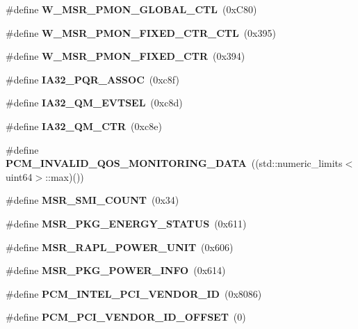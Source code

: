 \begin{DoxyCompactItemize}
\mbox{\label{types_8h_a376e23efde84a32d52b77f0849294aa0}} 
\#define {\bfseries W\+\_\+\+M\+S\+R\+\_\+\+P\+M\+O\+N\+\_\+\+G\+L\+O\+B\+A\+L\+\_\+\+C\+TL}~(0x\+C80)
\item 
\mbox{\label{types_8h_a42bbda41bb44de4240699ce676c55258}} 
\#define {\bfseries W\+\_\+\+M\+S\+R\+\_\+\+P\+M\+O\+N\+\_\+\+F\+I\+X\+E\+D\+\_\+\+C\+T\+R\+\_\+\+C\+TL}~(0x395)
\item 
\mbox{\label{types_8h_a38fcd86b97b8afd997982fbc3313e5e4}} 
\#define {\bfseries W\+\_\+\+M\+S\+R\+\_\+\+P\+M\+O\+N\+\_\+\+F\+I\+X\+E\+D\+\_\+\+C\+TR}~(0x394)
\item 
\mbox{\label{types_8h_a8de132d539b79a85d803bfccdc9383ad}} 
\#define {\bfseries I\+A32\+\_\+\+P\+Q\+R\+\_\+\+A\+S\+S\+OC}~(0xc8f)
\item 
\mbox{\label{types_8h_a15b6fe9866f264321ea09304a08c2f77}} 
\#define {\bfseries I\+A32\+\_\+\+Q\+M\+\_\+\+E\+V\+T\+S\+EL}~(0xc8d)
\item 
\mbox{\label{types_8h_a92fa198c0abe9741b9b25ed5cb6eff57}} 
\#define {\bfseries I\+A32\+\_\+\+Q\+M\+\_\+\+C\+TR}~(0xc8e)
\item 
\mbox{\label{types_8h_a337178dd27507783e200cd10bcea2ca3}} 
\#define {\bfseries P\+C\+M\+\_\+\+I\+N\+V\+A\+L\+I\+D\+\_\+\+Q\+O\+S\+\_\+\+M\+O\+N\+I\+T\+O\+R\+I\+N\+G\+\_\+\+D\+A\+TA}~((std\+::numeric\+\_\+limits$<$uint64$>$\+::max)())
\item 
\mbox{\label{types_8h_af256c7ed71bb83b77cee5c219ed523de}} 
\#define {\bfseries M\+S\+R\+\_\+\+S\+M\+I\+\_\+\+C\+O\+U\+NT}~(0x34)
\item 
\mbox{\label{types_8h_ae8952c7da879bc4523085c453d0bf460}} 
\#define {\bfseries M\+S\+R\+\_\+\+P\+K\+G\+\_\+\+E\+N\+E\+R\+G\+Y\+\_\+\+S\+T\+A\+T\+US}~(0x611)
\item 
\mbox{\label{types_8h_a888543788798e9b5a48ecac73b5169c2}} 
\#define {\bfseries M\+S\+R\+\_\+\+R\+A\+P\+L\+\_\+\+P\+O\+W\+E\+R\+\_\+\+U\+N\+IT}~(0x606)
\item 
\mbox{\label{types_8h_a442cae088121674772e8c0dc5ab4d8bf}} 
\#define {\bfseries M\+S\+R\+\_\+\+P\+K\+G\+\_\+\+P\+O\+W\+E\+R\+\_\+\+I\+N\+FO}~(0x614)
\item 
\mbox{\label{types_8h_ac1d4e070698e66acba029e80c1d4d36e}} 
\#define {\bfseries P\+C\+M\+\_\+\+I\+N\+T\+E\+L\+\_\+\+P\+C\+I\+\_\+\+V\+E\+N\+D\+O\+R\+\_\+\+ID}~(0x8086)
\item 
\mbox{\label{types_8h_a555a8cb40b170bdcf49d2d6b1cd1d368}} 
\#define {\bfseries P\+C\+M\+\_\+\+P\+C\+I\+\_\+\+V\+E\+N\+D\+O\+R\+\_\+\+I\+D\+\_\+\+O\+F\+F\+S\+ET}~(0)
\item 

\end{DoxyCompactItemize}
